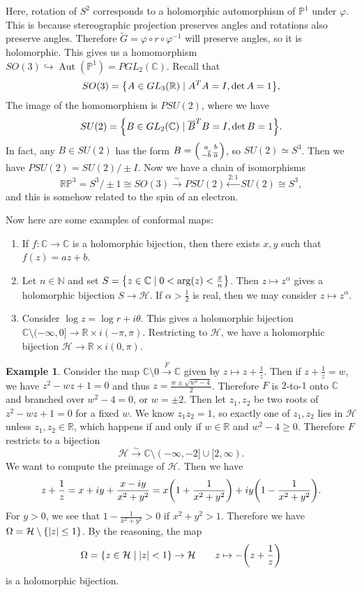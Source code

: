 \documentclass[leqno, openany]{memoir}
\theoremstyle{definition}
\newtheorem{exm}[thm]{Example}
\theoremstyle{remark}
\theoremstyle{plain}
\theoremstyle{definition}
\theoremstyle{remark}
\newcommand{\R}{\mathbb{R}}
\newcommand{\C}{\mathbb{C}}
\newcommand{\N}{\mathbb{N}}
\renewcommand{\P}{\mathbb{P}}
\newcommand{\mc}[1]{\mathcal{#1}}
\newcommand{\ol}[1]{\overline{#1}}
\newcommand{\wt}[1]{\widetilde{#1}}
\DeclareMathOperator{\Aut}{Aut}
\begin{document}
Here, rotation of $S^2$ corresponds to a holomorphic automorphism of $\P^1$ under $\varphi$. This is because stereographic projection preserves angles and rotations also preserve angles. Therefore $\wt{G} = \varphi \circ r \circ \varphi^{-1}$ will preserve angles, so it is holomorphic. This gives us a homomorphism $SO(3) \hookrightarrow \Aut(\P^1) = PGL_2(\C)$. Recall that
\[ SO(3) = \qty{A \in GL_3(\R) \mid A^T A = I, \det A = 1}, \]
The image of the homomorphism is $PSU(2)$, where we have
\[ SU(2) = \qty{B \in GL_2(\C) \mid \ol{B}^T B = I, \det B = 1}. \]
In fact, any $B \in SU(2)$ has the form $B = \begin{psmallmatrix}
    a & b \\
    -\ol{b} & \ol{a}
\end{psmallmatrix}$, so $SU(2) \simeq S^3$. Then we have $PSU(2) = SU(2) / \pm I$. Now we have a chain of isomorphisms
\[ \R\P^3 = S^3 / \pm 1 \cong SO(3) \xrightarrow{\sim} PSU(2) \xleftarrow{2:1} SU(2) \cong S^3, \]
and this is somehow related to the spin of an electron.

Now here are some examples of conformal maps:
\begin{enumerate}
    \item If $f \colon \C \to \C$ is a holomorphic bijection, then there exists $x,y$ such that $f(z) = az + b$.
    \item Let $n \in \N$ and set $S = \qty{z \in \C \mid 0 < \arg(z) < \frac{\pi}{n}}$. Then $z \mapsto z^{\alpha}$ gives a holomorphic bijection $S \to \mc{H}$. If $\alpha > \frac{1}{2}$ is real, then we may consider $z \mapsto z^{\alpha}$.
    \item Consider $\log z = \log r + i \theta$. This gives a holomorphic bijection $\C \setminus (-\infty, 0] \to \R \times i (-\pi, \pi)$. Restricting to $\mc{H}$, we have a holomorphic bijection $\mc{H} \to \R \times i (0, \pi)$.
\end{enumerate}

\begin{exm}
    Consider the map $\C \setminus \qty{0} \xrightarrow{F} \C$ given by $z \mapsto z + \frac{1}{z}$. Then if $z + \frac{1}{z} = w$, we have $z^2 - wz + 1 = 0$ and thus $z = \frac{w \pm \sqrt{w^2-4}}{2}$. Therefore $F$ is $2$-to-$1$ onto $\C$ and branched over $w^2 - 4 = 0$, or $w = \pm 2$. Then let $z_1, z_2$ be two roots of $z^2 - wz + 1 = 0$ for a fixed $w$. We know $z_1 z_2 = 1$, so exactly one of $z_1, z_2$ lies in $\mc{H}$ unless $z_1, z_2 \in \R$, which happens if and only if $w \in \R$ and $w^2 - 4 \geq 0$. Therefore $F$ restricts to a bijection
    \[ \mc{H} \xrightarrow{\sim} \C \setminus (-\infty, -2] \cup [2, \infty). \]
    We want to compute the preimage of $\mc{H}$. Then we have
    \[ z + \frac{1}{z} = x + iy + \frac{x-iy}{x^2 + y^2} = x \qty(1 + \frac{1}{x^2 + y^2}) + iy \qty(1 - \frac{1}{x^2 + y^2}). \]
    For $y > 0$, we see that $1 - \frac{1}{x^2 + y^2} > 0$ if $x^2 + y^2 > 1$. Therefore we have $\Omega = \mc{H} \setminus \qty{\abs{z} \leq 1}$. By the reasoning, the map
    \[ \Omega = \qty{z \in \mc{H} \mid \abs{z} < 1} \to \mc{H} \qquad z \mapsto -\qty(z + \frac{1}{z}) \]
    is a holomorphic bijection.
\end{exm}
\end{document}
